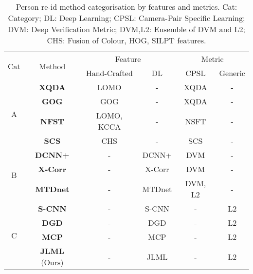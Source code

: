 \documentclass{article}
\begin{document}
\begin{table} [h!]
	\centering
	\scriptsize
\renewcommand{\arraystretch}{1}
	\setlength{\tabcolsep}{0.025 cm}
	\vspace{-.5cm}
	\caption{\footnotesize
		Person re-id method categorisation by features and metrics.
Cat: Category;
		DL: Deep Learning;
		CPSL: Camera-Pair Specific Learning;
		DVM: Deep Verification Metric;
		DVM,L2: Ensemble of DVM and L2;
		CHS: Fusion of Colour, HOG, SILPT features.
}
	\vskip 0pt \begin{tabular}{|c||c|c|c|c|c|}
		\hline
		\multirow{2}{*}{Cat}
		& \multirow{2}{*}{Method} 
		& \multicolumn{2}{c|}{Feature} & \multicolumn{2}{c|}{Metric} \\ 
		\cline{3-6}
		& & Hand-Crafted & DL & CPSL & Generic \\ 
		\hline 
		\hline
\multirow{4}{*}{A}
		& {\bf XQDA} \cite{liao2015person} 
		& LOMO & - 
		& XQDA & - \\   & {\bf GOG} \cite{matsukawa2016hierarchical} 
		& GOG & - 
		& XQDA & - \\  & {\bf NFST} \cite{zhang2016learning} 
		& LOMO, KCCA & - 
		& NSFT & - \\ 
& {\bf SCS} \cite{chen2016similarity} 
		& CHS & -
		& SCS & - \\
		\hline
\multirow{3}{*}{B}
		& {\bf DCNN+} \cite{ahmed2015improved} 
		& - & DCNN+ 
		& DVM & - \\
& {\bf X-Corr} \cite{subramaniam2016deep} 
		& - & X-Corr 
		& DVM & - \\ 
& {\bf MTDnet} \cite{chen2016multi}
		& - & MTDnet 
		& DVM, L2 & - \\
\hline
\multirow{4}{*}{C}
		& {\bf S-CNN} \cite{varior2016gated} 
		& - & S-CNN 
		& - & L2 \\ 
& {\bf DGD} \cite{xiao2016learning} 
		& - & DGD 
		& - & L2 \\ 
& {\bf MCP} \cite{Cheng_TCP} 
		& - & MCP 
		& - & L2 \\
& {\bf JLML} (Ours)
		& - & {JLML} 
		& - & L2 \\
		\hline
	\end{tabular}\label{tab:methods}
	\vspace{-.3cm}
\end{table}
\end{document}
